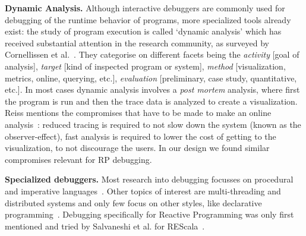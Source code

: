 
\textbf{Dynamic Analysis.}
Although interactive debuggers are commonly used for debugging 
of the runtime behavior of programs, more specialized tools already exist: 
the study of program execution is called `dynamic analysis' which has 
received substantial attention in the research community,
as surveyed by Cornellissen et al.~\cite{cornelissen2009systematic}.
They categorise on different facets being the 
\textit{activity} [goal of analysis],
\textit{target} [kind of inspected program or system],
\textit{method} [visualization, metrics, online, querying, etc.],
\textit{evaluation} [preliminary, case study, quantitative, etc.].
In most cases dynamic analysis involves a \textit{post mortem} analysis, 
where first the program is run and then the trace data is analyzed to create a visualization.
Reiss mentions the compromises that have to be made to make an online analysis~\cite{reiss2006visualizing}: 
reduced tracing is required to not slow down the system (known as the observer-effect), 
fast analysis is required to lower the cost of getting to the visualization, to not discourage the users.
In our design we found similar compromises relevant for RP debugging.


\textbf{Specialized debuggers.}
Most research into debugging focusses on procedural and 
imperative languages~\cite{cornelissen2009systematic}.
Other topics of interest are multi-threading and distributed systems and 
only few focus on other styles, like declarative programming~\cite{nilsson1998declarative}.
Debugging specifically for Reactive Programming was only first mentioned and tried by Salvaneshi et al. for REScala~\cite{salvaneschi2014empirical,salvaneschi2016debugging}.


